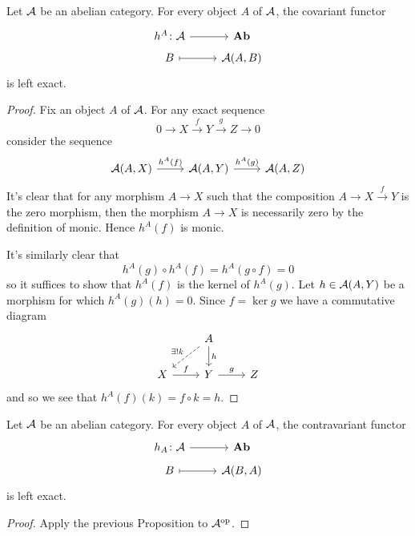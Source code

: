 \documentclass[reqno, 12pt]{amsart}
\begin{document}
\begin{proposition}
  Let $\mathcal{A}$ be an abelian category.
  For every object $A$ of $\mathcal{A}$, the covariant functor
  $$\begin{tikzcd}[row sep=tiny]
    h^A \colon \A \arrow{r} & \Ab\\
    B \arrow[mapsto]{r} & \A(A,B)
  \end{tikzcd}$$
  is left exact.
\end{proposition}
\begin{proof}
  Fix an object $A$ of $\mathcal{A}$.
  For any exact sequence
  $$0 \to X \overset{f}\to Y \overset{g}\to Z \to 0$$
  consider the sequence
  $$\begin{tikzcd}
    \A(A,X) \arrow{r}{h^A(f)} & \A(A,Y) \arrow{r}{h^A(g)} & \A(A,Z)
  \end{tikzcd}$$
  It's clear that for any morphism $A \to X$ such that the composition
  $A \to X \overset{f}\to Y$ is the zero morphism, then the morphism $A \to X$ is necessarily zero by the definition of monic.
  Hence $h^A(f)$ is monic.

  It's similarly clear that
  $$h^A(g) \circ h^A(f) = h^A(g \circ f) = 0$$
  so it suffices to show that $h^A(f)$ is the kernel of $h^A(g)$.
  Let $h \in \mathcal{A}(A,Y)$ be a morphism for which $h^A(g)(h) = 0$.
  Since $f = \ker{g}$ we have a commutative diagram
  $$\begin{tikzcd}
    & A\arrow{d}{h}\arrow[dashed,swap]{ld}{\exists !k}\\
    X \arrow{r}{f} & Y \arrow{r}{g} & Z
  \end{tikzcd}$$
  and so we see that $h^A(f)(k) = f \circ k = h$.
\end{proof}

\begin{corollary}\label{cor: reps are lex}
  Let $\mathcal{A}$ be an abelian category.
  For every object $A$ of $\mathcal{A}$, the contravariant functor
  $$\begin{tikzcd}[row sep=tiny]
    h_A \colon \A \arrow{r} & \Ab\\
    B \arrow[mapsto]{r} & \A(B,A)
  \end{tikzcd}$$
  is left exact.
\end{corollary}
\begin{proof}
  Apply the previous Proposition to $\mathcal{A}^{\operatorname{op}}$.
\end{proof}
\end{document}
